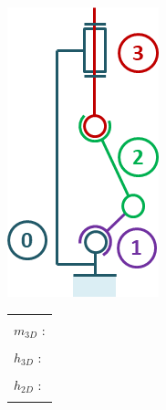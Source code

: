 \documentclass[10pt,fleqn]{article} %
\begin{document}
\begin{multicols}{2}
\begin{minipage}[c]{.45\linewidth}
\begin{center}
\includegraphics[width=.8\linewidth]{images/cas_11.png}
\end{center}
\end{minipage} \hfill
\begin{minipage}[c]{.5\linewidth}
\begin{center}
\begin{tabular}{|p{3cm}|}
\hline 
\\
$m_{3D}$ : \\
\\
$h_{3D}$ : \\
\\
$h_{2D}$ : \\
\\
\hline
\end{tabular}
\end{center}
\end{minipage}



\end{multicols}
\end{document}
